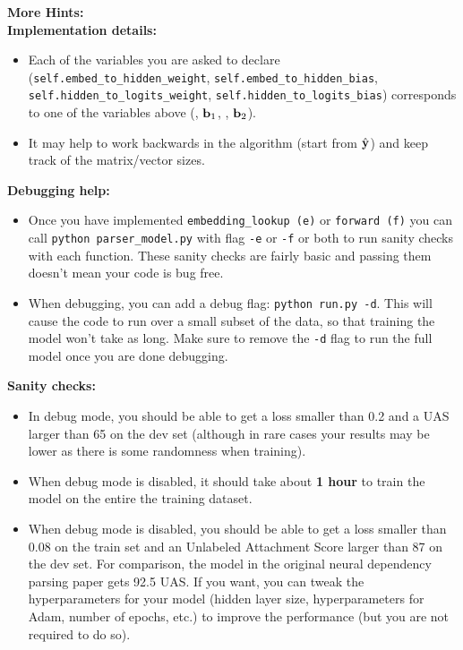 \begin{parts}
    \textbf{More Hints:}\\
    \textbf{Implementation details:}
    \begin{itemize}
        \item Each of the variables you are asked to declare (\texttt{self.embed\_to\_hidden\_weight}, \newline \texttt{self.embed\_to\_hidden\_bias}, \texttt{self.hidden\_to\_logits\_weight}, \newline \texttt{self.hidden\_to\_logits\_bias}) corresponds to one of the variables above (\bW, $\mathbf{b}_1$, \bU, $\mathbf{b}_2$).  
        \item It may help to work backwards in the algorithm (start from $\hat{\mathbf{y}}$) and keep track of the matrix/vector sizes.
    \end{itemize}
    \textbf{Debugging help:}
    \begin{itemize}
        \item Once you have implemented \texttt{embedding\_lookup (e)} or \texttt{forward (f)} you can call \texttt{python parser\_model.py} with flag \texttt{-e} or \texttt{-f} or both to run sanity checks with each function. These sanity checks are fairly basic and passing them doesn't mean your code is bug free.
        \item
            When debugging, you can add a debug flag: \texttt{python run.py -d}. This will cause the code to run over a small subset of the data, so that training the model won't take as long. Make sure to remove the \texttt{-d} flag to run the full model once you are done debugging.
    \end{itemize}
    \textbf{Sanity checks:}
    \begin{itemize}
        \item
            In debug mode, you should be able to get a loss smaller than 0.2 and a UAS larger than 65 on the dev set (although in rare cases your results may be lower as there is some randomness when training).
        
        \item When debug mode is disabled, it should take about \textbf{1 hour} to train the model on the entire the training dataset. 
        
        \item When debug mode is disabled, you should be able to get a loss smaller than 0.08 on the train set and an Unlabeled Attachment Score larger than 87 on the dev set. For comparison, the model in the original neural dependency parsing paper gets 92.5 UAS. If you want, you can tweak the hyperparameters for your model (hidden layer size, hyperparameters for Adam, number of epochs, etc.) to improve the performance (but you are not required to do so).
    \end{itemize}
    

\end{parts}
